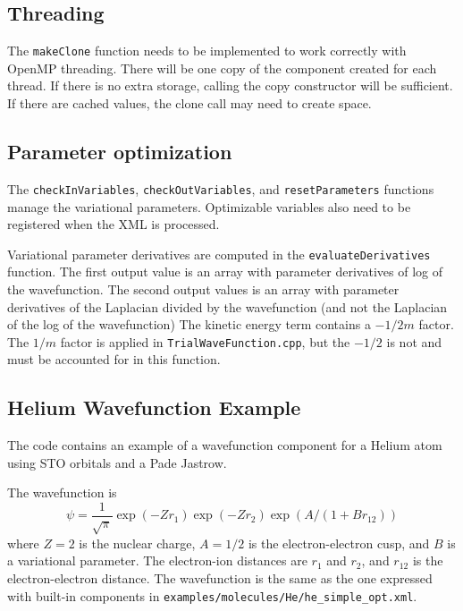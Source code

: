 \subsection{Threading}
The \texttt{makeClone} function needs to be implemented to work correctly with OpenMP threading.
There will be one copy of the component created for each thread.
If there is no extra storage, calling the copy constructor will be sufficient.
If there are cached values, the clone call may need to create space.


\subsection{Parameter optimization}

The \texttt{checkInVariables}, \texttt{checkOutVariables}, and \texttt{resetParameters} functions manage the variational parameters.
Optimizable variables also need to be registered when the XML is processed.

Variational parameter derivatives are computed in the \texttt{evaluateDerivatives} function.
The first output value is an array with parameter derivatives of log of the wavefunction.
The second output values is an array with parameter derivatives of
the Laplacian divided by the wavefunction (and not the Laplacian of the log of the wavefunction)
The kinetic energy term contains a $-1/2m$ factor.
The $1/m$ factor is applied in \texttt{TrialWaveFunction.cpp}, but the $-1/2$ is not and must be accounted for in this function.




\subsection{Helium Wavefunction Example}
\label{sec:helium_wavefunction_example}
The code contains an example of a wavefunction component for a Helium atom using STO orbitals and a Pade Jastrow.

The wavefunction is
\begin{equation}
\psi = \frac{1}{\sqrt{\pi}} \exp(-Z r_1) \exp(-Z r_2) \exp(A / (1 + B r_{12}))
\end{equation}
where $Z = 2$ is the nuclear charge, $A=1/2$ is the electron-electron cusp, and $B$ is a variational parameter.
The electron-ion distances are $r_1$ and $r_2$, and $r_{12}$ is the electron-electron distance.
The wavefunction is the same as the one expressed with built-in components in \texttt{examples/molecules/He/he\_simple\_opt.xml}.

